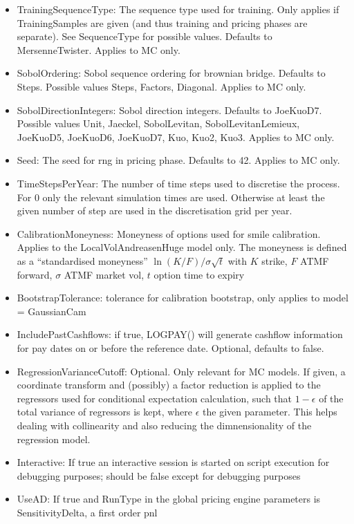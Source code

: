 \begin{itemize}
\item TrainingSequenceType: The sequence type used for training. Only applies if TrainingSamples are given (and thus
  training and pricing phases are separate). See SequenceType for possible values. Defaults to MersenneTwister. Applies
  to MC only.
\item SobolOrdering: Sobol sequence ordering for brownian bridge. Defaults to Steps. Possible values Steps, Factors,
  Diagonal. Applies to MC only.
\item SobolDirectionIntegers: Sobol direction integers. Defaults to JoeKuoD7. Possible values Unit, Jaeckel,
  SobolLevitan, SobolLevitanLemieux, JoeKuoD5, JoeKuoD6, JoeKuoD7, Kuo, Kuo2, Kuo3. Applies to MC only.
\item Seed: The seed for rng in pricing phase. Defaults to 42. Applies to MC only.
\item TimeStepsPerYear: The number of time steps used to discretise the process. For 0 only the relevant simulation
  times are used. Otherwise at least the given number of step are used in the discretisation grid per year.
\item CalibrationMoneyness: Moneyness of options used for smile calibration. Applies to the LocalVolAndreasenHuge model
  only. The moneyness is defined as a ``standardised moneyness'' $\ln(K/F) / \sigma\sqrt{t}$ with $K$ strike, $F$ ATMF
  forward, $\sigma$ ATMF market vol, $t$ option time to expiry
\item BootstrapTolerance: tolerance for calibration bootstrap, only applies to model = GaussianCam
\item IncludePastCashflows: if true, LOGPAY() will generate cashflow information for pay dates on or before the
  reference date. Optional, defaults to false.
\item RegressionVarianceCutoff: Optional. Only relevant for MC models. If given, a coordinate transform and (possibly) a
  factor reduction is applied to the regressors used for conditional expectation calculation, such that $1-\epsilon$ of
  the total variance of regressors is kept, where $\epsilon$ the given parameter. This helps dealing with collinearity
  and also reducing the dimnensionality of the regression model.
\item Interactive: If true an interactive session is started on script execution for debugging purposes; should be false
  except for debugging purposes
\item UseAD: If true and RunType in the global pricing engine parameters is SensitivityDelta, a first order pnl

\end{itemize}
